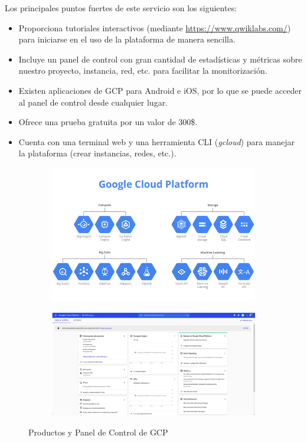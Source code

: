 \documentclass[12pt,spanish]{article}
\begin{document}
Los principales puntos fuertes de este servicio son los siguientes:
\begin{itemize}
	\item Proporciona tutoriales interactivos (mediante \href{https://www.qwiklabs.com/}{https://www.qwiklabs.com/}) para iniciarse en el uso de la plataforma de manera sencilla.
	\item Incluye un panel de control con gran cantidad de estadísticas y métricas sobre nuestro proyecto, instancia, red, etc. para facilitar la monitorización.
	\item Existen aplicaciones de GCP para Android e iOS, por lo que se puede acceder al panel de control desde cualquier lugar.
	\item Ofrece una prueba gratuita por un valor de 300\$.
	\item Cuenta con una terminal web y una herramienta CLI (\emph{gcloud}) para manejar la plataforma (crear instancias, redes, etc.).
\end{itemize}

\begin{figure}[H]
  \begin{subfigure}[t]{0.5\textwidth}
    \centering
		\includegraphics[width=\textwidth]{project/gcp_products.png}
  \end{subfigure}
  \hspace{0.5cm}
  \begin{subfigure}[t]{0.5\textwidth}
    \centering
		\includegraphics[width=\textwidth]{project/controlpanel.png}
  \end{subfigure}
	\caption{Productos y Panel de Control de GCP}
\end{figure}
\newpage
\end{document}
